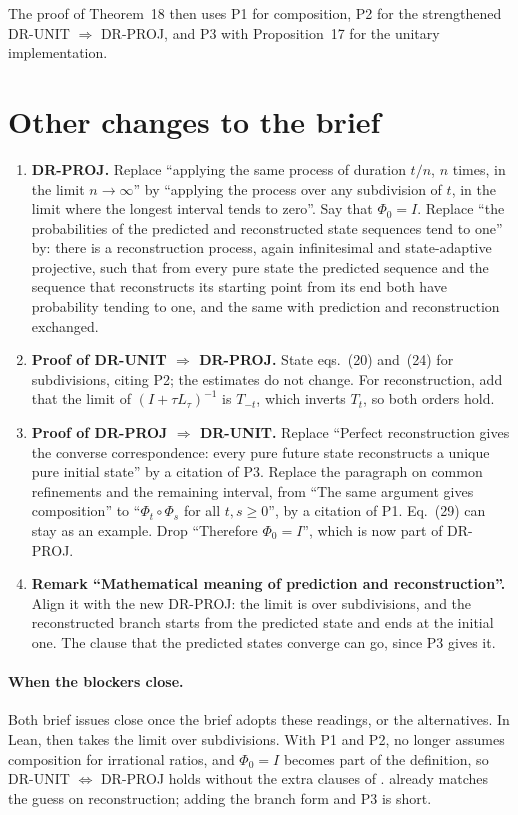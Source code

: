 \documentclass[11pt]{article}
\begin{document}
\noindent
The proof of Theorem~18 then uses P1 for composition, P2 for the strengthened DR-UNIT
$\Rightarrow$ DR-PROJ, and P3 with Proposition~17 for the unitary implementation.

\section{Other changes to the brief}

\begin{enumerate}
\item \textbf{DR-PROJ.} Replace ``applying the same process of duration $t/n$, $n$ times, in the
  limit $n \to \infty$'' by ``applying the process over any subdivision of $t$, in the limit where
  the longest interval tends to zero''. Say that $\Phi_0 = I$. Replace ``the probabilities of the
  predicted and reconstructed state sequences tend to one'' by: there is a reconstruction process,
  again infinitesimal and state-adaptive projective, such that from every pure state the predicted
  sequence and the sequence that reconstructs its starting point from its end both have
  probability tending to one, and the same with prediction and reconstruction exchanged.
\item \textbf{Proof of DR-UNIT $\Rightarrow$ DR-PROJ.} State eqs.~(20) and~(24) for subdivisions,
  citing P2; the estimates do not change. For reconstruction, add that the limit of
  $(I + \tau L_\tau)^{-1}$ is $T_{-t}$, which inverts $T_t$, so both orders hold.
\item \textbf{Proof of DR-PROJ $\Rightarrow$ DR-UNIT.} Replace ``Perfect reconstruction gives the
  converse correspondence: every pure future state reconstructs a unique pure initial state'' by a
  citation of P3. Replace the paragraph on common refinements and the remaining interval, from
  ``The same argument gives composition'' to ``$\Phi_t\circ\Phi_s$ for all $t, s \ge 0$'', by a
  citation of P1. Eq.~(29) can stay as an example. Drop ``Therefore $\Phi_0 = I$'', which is now
  part of DR-PROJ.
\item \textbf{Remark ``Mathematical meaning of prediction and reconstruction''.} Align it with the
  new DR-PROJ: the limit is over subdivisions, and the reconstructed branch starts from the
  predicted state and ends at the initial one. The clause that the predicted states converge can
  go, since P3 gives it.
\end{enumerate}

\paragraph{When the blockers close.} Both brief issues close once the brief adopts these
readings, or the alternatives. In Lean,  then takes the limit over
subdivisions. With P1 and P2,  no longer assumes composition
for irrational ratios, and $\Phi_0 = I$ becomes part of the definition, so DR-UNIT
$\Leftrightarrow$ DR-PROJ holds without the extra clauses of
.  already matches the guess on
reconstruction; adding the branch form and P3 is short.
\end{document}
